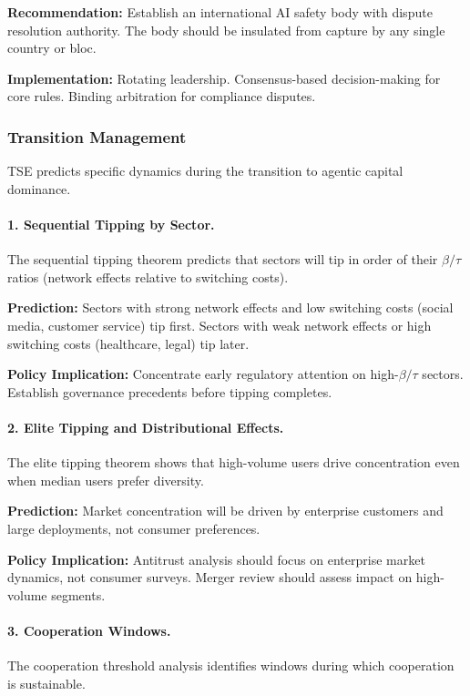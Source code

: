 \documentclass[12pt]{article}
\begin{document}
\textbf{Recommendation:} Establish an international AI safety body with dispute resolution authority. The body should be insulated from capture by any single country or bloc.

\textbf{Implementation:} Rotating leadership. Consensus-based decision-making for core rules. Binding arbitration for compliance disputes.

\subsubsection{Transition Management}

TSE predicts specific dynamics during the transition to agentic capital dominance.

\paragraph{1. Sequential Tipping by Sector.}
The sequential tipping theorem predicts that sectors will tip in order of their $\beta / \tau$ ratios (network effects relative to switching costs).

\textbf{Prediction:} Sectors with strong network effects and low switching costs (social media, customer service) tip first. Sectors with weak network effects or high switching costs (healthcare, legal) tip later.

\textbf{Policy Implication:} Concentrate early regulatory attention on high-$\beta / \tau$ sectors. Establish governance precedents before tipping completes.

\paragraph{2. Elite Tipping and Distributional Effects.}
The elite tipping theorem shows that high-volume users drive concentration even when median users prefer diversity.

\textbf{Prediction:} Market concentration will be driven by enterprise customers and large deployments, not consumer preferences.

\textbf{Policy Implication:} Antitrust analysis should focus on enterprise market dynamics, not consumer surveys. Merger review should assess impact on high-volume segments.

\paragraph{3. Cooperation Windows.}
The cooperation threshold analysis identifies windows during which cooperation is sustainable.
\end{document}
